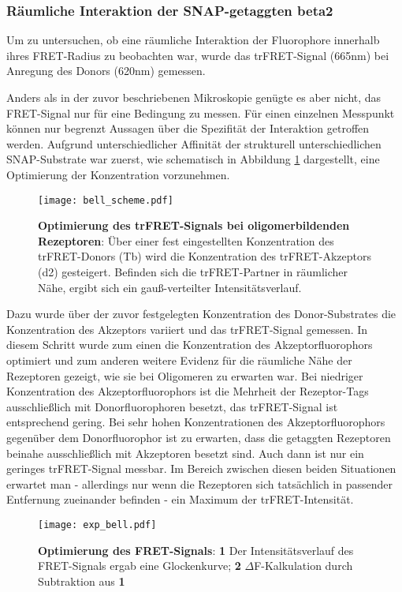 \subsubsection{Räumliche Interaktion der SNAP-getaggten \gls{beta2}}
\label{bell}
Um zu untersuchen, ob eine räumliche Interaktion der Fluorophore innerhalb ihres FRET-Radius zu beobachten war, wurde das trFRET-Signal (665nm) bei Anregung des Donors (620nm) gemessen. 

Anders als in der zuvor beschriebenen Mikroskopie genügte es aber nicht, das FRET-Signal nur für eine Bedingung zu messen. Für einen einzelnen Messpunkt können nur begrenzt Aussagen über die Spezifität der Interaktion getroffen werden. Aufgrund unterschiedlicher Affinität der strukturell unterschiedlichen SNAP-Substrate war zuerst, wie schematisch in Abbildung \ref{fig:bell} dargestellt, eine Optimierung der Konzentration vorzunehmen.

\begin{figure}[htbp]
	\centering
    \texttt{[image: bell\_scheme.pdf]}
    \caption{\textbf{Optimierung des trFRET-Signals bei oligomerbildenden Rezeptoren}: Über einer fest eingestellten Konzentration des trFRET-Donors (Tb) wird die Konzentration des trFRET-Akzeptors (d2) gesteigert. Befinden sich die trFRET-Partner in räumlicher Nähe, ergibt sich ein gauß-verteilter Intensitätsverlauf.}
\label{fig:bell}
\end{figure}

 Dazu wurde über der zuvor festgelegten Konzentration des Donor-Substrates die Konzentration des Akzeptors variiert und das trFRET-Signal gemessen. In diesem Schritt wurde zum einen die Konzentration des Akzeptorfluorophors optimiert und zum anderen weitere Evidenz für die räumliche Nähe der Rezeptoren gezeigt, wie sie bei Oligomeren zu erwarten war. Bei niedriger Konzentration des Akzeptorfluorophors ist die Mehrheit der Rezeptor-Tags ausschließlich mit Donorfluorophoren besetzt, das trFRET-Signal ist entsprechend gering. Bei sehr hohen Konzentrationen des Akzeptorfluorophors gegenüber dem Donorfluorophor ist zu erwarten, dass die getaggten Rezeptoren beinahe ausschließlich mit Akzeptoren besetzt sind. Auch dann ist nur ein geringes trFRET-Signal messbar. Im Bereich zwischen diesen beiden Situationen erwartet man - allerdings nur wenn die Rezeptoren sich tatsächlich in passender Entfernung zueinander befinden - ein Maximum der trFRET-Intensität.

\begin{figure}[htbp]
	\centering
    \texttt{[image: exp\_bell.pdf]}
    \caption{\textbf{Optimierung des FRET-Signals}: \textbf{1} Der Intensitätsverlauf des FRET-Signals ergab eine Glockenkurve;  \textbf{2} $\Delta$F-Kalkulation durch Subtraktion aus \textbf{1}} 
    \label{fig:exp_bell}
\end{figure}

